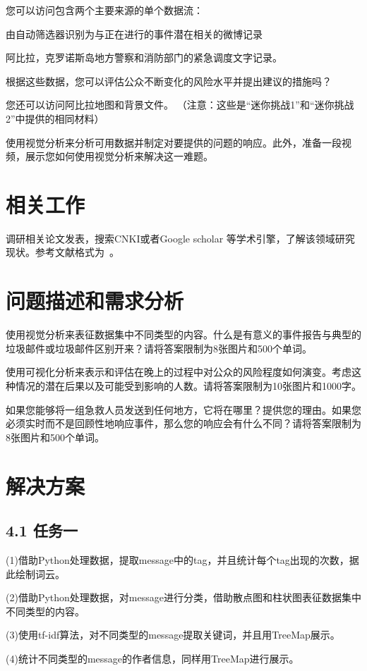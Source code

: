 \documentclass[a4paper]{article}
\begin{document}
您可以访问包含两个主要来源的单个数据流：

由自动筛选器识别为与正在进行的事件潜在相关的微博记录

阿比拉，克罗诺斯岛地方警察和消防部门的紧急调度文字记录。

根据这些数据，您可以评估公众不断变化的风险水平并提出建议的措施吗？

您还可以访问阿比拉地图和背景文件。 （注意：这些是“迷你挑战1”和“迷你挑战2”中提供的相同材料）

使用视觉分析来分析可用数据并制定对要提供的问题的响应。此外，准备一段视频，展示您如何使用视觉分析来解决这一难题。

\section{相关工作}

调研相关论文发表，搜索CNKI或者Google scholar 等学术引擎，了解该领域研究现状。参考文献格式为~\cite{bayrak2020pragma}。

\section{问题描述和需求分析}
\label{Data and Task Abstraction}
使用视觉分析来表征数据集中不同类型的内容。什么是有意义的事件报告与典型的垃圾邮件或垃圾邮件区别开来？请将答案限制为8张图片和500个单词。

使用可视化分析来表示和评估在晚上的过程中对公众的风险程度如何演变。考虑这种情况的潜在后果以及可能受到影响的人数。请将答案限制为10张图片和1000字。

如果您能够将一组急救人员发送到任何地方，它将在哪里？提供您的理由。如果您必须实时而不是回顾性地响应事件，那么您的响应会有什么不同？请将答案限制为8张图片和500个单词。

\section{解决方案}
\subsection*{ 4.1 任务一}
(1)借助Python处理数据，提取message中的tag，并且统计每个tag出现的次数，据此绘制词云。

(2)借助Python处理数据，对message进行分类，借助散点图和柱状图表征数据集中不同类型的内容。

(3)使用tf-idf算法，对不同类型的message提取关键词，并且用TreeMap展示。

(4)统计不同类型的message的作者信息，同样用TreeMap进行展示。
\end{document}
